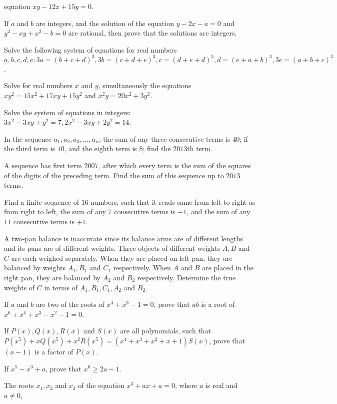   equation $xy - 12x + 15y = 0$.
\item If $a$ and $b$ are integers, and the solution of the equation $y - 2x - a = 0$ and $y^2 - xy + x^2 - b
  = 0$ are rational, then prove that the solutions are integers.
\item Solve the following system of equations for real numbers $a, b, c, d, e: 3a = (b + c + d)^3, 3b = (c +
  d + e)^3, c = (d + e + d)^3, d = (e + a + b)^3, 3e = (a + b + c)^3$.
\item Solve for real numbers $x$ and $y$, simultaneously the equations $xy^2 = 15x^2 + 17xy + 15y^2$ and
  $x^2y = 20x^2 + 3y^2$.
\item Solve the system of equations in integers: $3x^2 - 3xy + y^2 = 7, 2x^2 - 3xy + 2y^2 = 14$.
\item In the sequence $a_1, a_2, a_3, \ldots, a_n$, the sum of any three consecutive terms is $40$; if the
  third term is $10$, and the eighth term is $8$; find the $2013$th term.
\item A sequence  has first term $2007$, after which every term is the sum of the squares of the digits of
  the preceding term. Find the sum of this sequence up to $2013$ terms.
\item Find a finite sequence of $16$ numbers, such that it reads same from left to right as from right to
  left, the sum of any $7$ consecutive terms is $-1$, and the sum of any $11$ consecutive terms is $+1$.
\item A two-pan balance is inaccurate since its balance arms are of different lengths and its pans are of
  different weights. Three objects of different weights $A, B$ and $C$ are each weighed separately. When
  they are placed on left pan, they are balanced by weights $A_1, B_1$ and $C_1$ respectively. When $A$ and
  $B$ are placed in the right pan, they are balanced by $A_2$ and $B_2$ respectively. Determine the true
  weights of $C$ in terms of $A_1, B_1, C_1, A_2$ and $B_2$.
\item If $a$ and $b$ are two of the roots of $x^4 + x^3 - 1 = 0$, prove that $ab$ is a root of $x^6 + x^4 +
  x^3 - x^2 - 1 = 0$.
\item If $P(x), Q(x), R(x)$ and $S(x)$ are all polynomials, such that $P(x^5) + xQ(x^5) + x^2R(x^5) = (x^4 +
  x^3 + x^2 + x + 1)S(x)$, prove that $(x - 1)$ is a factor of $P(x)$.
\item If $x^5 - x^3 + a$, prove that $x^6\geq 2a - 1$.
\item The roots $x_1, x_2$ and $x_3$ of the equation $x^3 + ax + a = 0$, where $a$ is real and $a\neq 0$,
